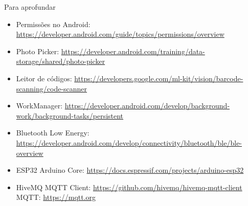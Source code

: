 \documentclass[aspectratio=169,10pt]{beamer}
\begin{document}
\begin{frame}{Para aprofundar}
  \small
  \begin{itemize}
    \item Permissões no Android: \url{https://developer.android.com/guide/topics/permissions/overview}
    \item Photo Picker: \url{https://developer.android.com/training/data-storage/shared/photo-picker}
    \item Leitor de códigos: \url{https://developers.google.com/ml-kit/vision/barcode-scanning/code-scanner}
    \item WorkManager: \url{https://developer.android.com/develop/background-work/background-tasks/persistent}
    \item Bluetooth Low Energy: \url{https://developer.android.com/develop/connectivity/bluetooth/ble/ble-overview}
    \item ESP32 Arduino Core: \url{https://docs.espressif.com/projects/arduino-esp32}
    \item HiveMQ MQTT Client: \url{https://github.com/hivemq/hivemq-mqtt-client} \quad MQTT: \url{https://mqtt.org}
  \end{itemize}
\end{frame}
\end{document}
